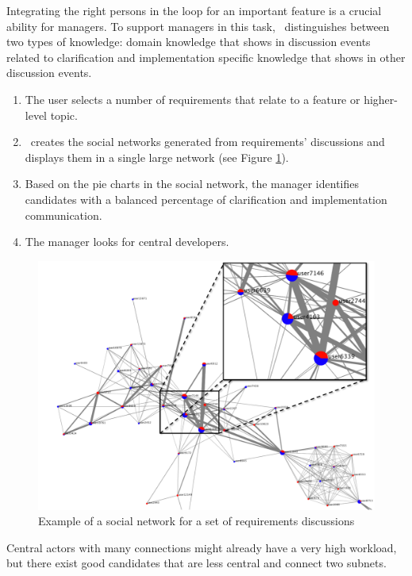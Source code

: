 Integrating the right persons in the loop for an important feature is a crucial ability for managers.
To support managers in this task, \viss\ distinguishes between two types of knowledge: domain knowledge that shows in discussion events related to clarification and implementation specific knowledge that shows in other discussion events.
\begin{enumerate}
\item The user selects a number of requirements that relate to a feature or higher-level topic. 
\item \viss\ creates the social networks generated from requirements' discussions and displays them in a single large network (see Figure \ref{fig:example-sn-large}).
\item Based on the pie charts in the social network, the manager identifies candidates with a balanced percentage of clarification and implementation communication.
\item The manager looks for central developers. 
\end{enumerate}
\begin{figure}
\includegraphics[width=\columnwidth]{img/example-sn-large}
\caption{Example of a social network for a set of requirements discussions}
\label{fig:example-sn-large}
\end{figure}
Central actors with many connections might already have a very high workload, but there exist good candidates that are less central and connect two subnets.
